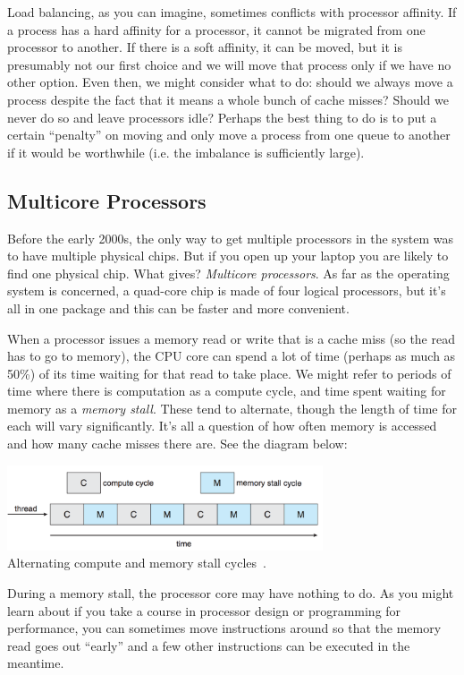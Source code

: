 Load balancing, as you can imagine, sometimes conflicts with processor affinity. If a process has a hard affinity for a processor, it cannot be migrated from one processor to another. If there is a soft affinity, it can be moved, but it is presumably not our first choice and we will move that process only if we have no other option. Even then, we might consider what to do: should we always move a process despite the fact that it means a whole bunch of cache misses? Should we never do so and leave processors idle? Perhaps the best thing to do is to put a certain ``penalty'' on moving and only move a process from one queue to another if it would be worthwhile (i.e. the imbalance is sufficiently large).

\subsection*{Multicore Processors}
Before the early 2000s, the only way to get multiple processors in the system was to have multiple physical chips. But if you open up your laptop you are likely to find one physical chip. What gives? \textit{Multicore processors}. As far as the operating system is concerned, a quad-core chip is made of four logical processors, but it's all in one package and this can be faster and more convenient.

When a processor issues a memory read or write that is a cache miss (so the read has to go to memory), the CPU core can spend a lot of time (perhaps as much as 50\%) of its time waiting for that read to take place. We might refer to periods of time where there is computation as a compute cycle, and time spent waiting for memory as a \textit{memory stall}. These tend to alternate, though the length of time for each will vary significantly. It's all a question of how often memory is accessed and how many cache misses there are. See the diagram below:

\begin{center}
	\includegraphics[width=0.7\textwidth]{images/memory-stall.png}\\
	Alternating compute and memory stall cycles~\cite{osc}.
\end{center}

During a memory stall, the processor core may have nothing to do. As you might learn about if you take a course in processor design or programming for performance, you can sometimes move instructions around so that the memory read goes out ``early'' and a few other instructions can be executed in the meantime. 

